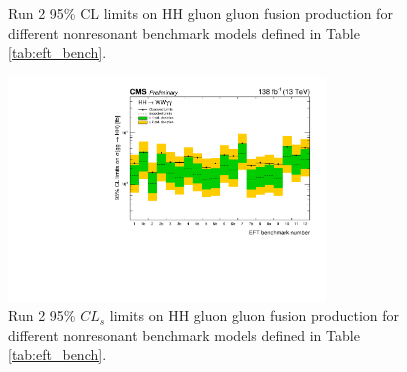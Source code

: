 \begin{figure}[!htbp]
    \setcounter{subfigure}{0}
    \centering
    \qquad
    \qquad
    \caption{Run 2 95\% CL limits on HH gluon gluon fusion production for different nonresonant benchmark models defined in Table \ref{tab:eft_bench}.  }
    \label{fig:20_EFT_benchmark_results_perchannel}
\end{figure}


\begin{figure}[!htbp]
\centering
\includegraphics[width=0.75\textwidth]{Sections/HHWWgg/images/Results/EFT_CombinedUpperlimits.pdf}
\caption{Run 2 95\% $CL_{s}$ limits on HH gluon gluon fusion production for different nonresonant benchmark models defined in Table \ref{tab:eft_bench}.}
\label{fig:20_EFT_benchmark_results_all}
\end{figure}

